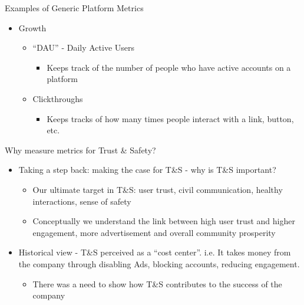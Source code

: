 \documentclass[nobackground,dvipsnames,table]{beamer}
\begin{document}
\begin{frame}{Examples of Generic Platform Metrics}

\begin{itemize}
    \item Growth

    \begin{itemize}
        \item “DAU” - Daily Active Users

        \begin{itemize}
            \item Keeps track of the number of people who have active accounts on a platform

        \end{itemize}
        
        \item Clickthroughs

        \begin{itemize}
            \item Keeps tracks of how many times people interact with a link, button, etc.
        \end{itemize}
    \end{itemize}
\end{itemize}

\end{frame}


\begin{frame}{Why measure metrics for Trust \& Safety?}
\begin{itemize}
    \item Taking a step back: making the case for T\&S - why is T\&S important?

    \begin{itemize}
        \item Our ultimate target in T\&S: user trust, civil communication, healthy interactions, sense of safety 
        \item Conceptually we understand the link between high user trust and higher engagement, more advertisement and overall community prosperity
    \end{itemize}

    \item Historical view - T\&S perceived as a “cost center”. i.e. It takes money from the company through disabling Ads, blocking accounts, reducing engagement.

    \begin{itemize}
        \item There was a need to show how T\&S contributes to the success of the company

    \end{itemize}
\end{itemize}

\end{frame}
\end{document}
